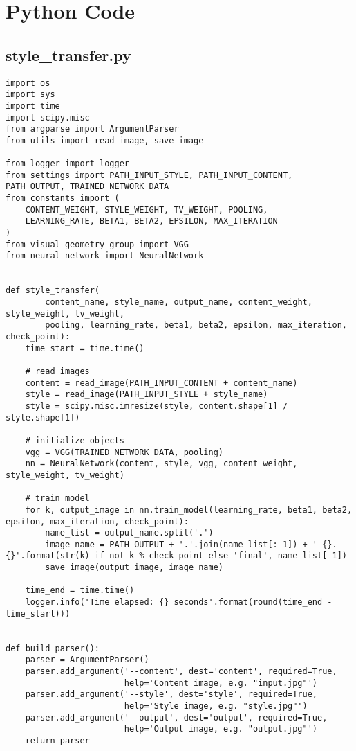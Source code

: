 \chapter{Python Code}
\label{app:code}


\begin{spacing}{1}
\section{style\_transfer.py}
\label{sec:code:st}
\begin{lstlisting}
import os
import sys
import time
import scipy.misc
from argparse import ArgumentParser
from utils import read_image, save_image

from logger import logger
from settings import PATH_INPUT_STYLE, PATH_INPUT_CONTENT, PATH_OUTPUT, TRAINED_NETWORK_DATA
from constants import (
    CONTENT_WEIGHT, STYLE_WEIGHT, TV_WEIGHT, POOLING,
    LEARNING_RATE, BETA1, BETA2, EPSILON, MAX_ITERATION
)
from visual_geometry_group import VGG
from neural_network import NeuralNetwork


def style_transfer(
        content_name, style_name, output_name, content_weight, style_weight, tv_weight,
        pooling, learning_rate, beta1, beta2, epsilon, max_iteration, check_point):
    time_start = time.time()

    # read images
    content = read_image(PATH_INPUT_CONTENT + content_name)
    style = read_image(PATH_INPUT_STYLE + style_name)
    style = scipy.misc.imresize(style, content.shape[1] / style.shape[1])

    # initialize objects
    vgg = VGG(TRAINED_NETWORK_DATA, pooling)
    nn = NeuralNetwork(content, style, vgg, content_weight, style_weight, tv_weight)

    # train model
    for k, output_image in nn.train_model(learning_rate, beta1, beta2, epsilon, max_iteration, check_point):
        name_list = output_name.split('.')
        image_name = PATH_OUTPUT + '.'.join(name_list[:-1]) + '_{}.{}'.format(str(k) if not k % check_point else 'final', name_list[-1])
        save_image(output_image, image_name)

    time_end = time.time()
    logger.info('Time elapsed: {} seconds'.format(round(time_end - time_start)))


def build_parser():
    parser = ArgumentParser()
    parser.add_argument('--content', dest='content', required=True,
                        help='Content image, e.g. "input.jpg"')
    parser.add_argument('--style', dest='style', required=True,
                        help='Style image, e.g. "style.jpg"')
    parser.add_argument('--output', dest='output', required=True,
                        help='Output image, e.g. "output.jpg"')
    return parser



\end{lstlisting}
\end{spacing}
